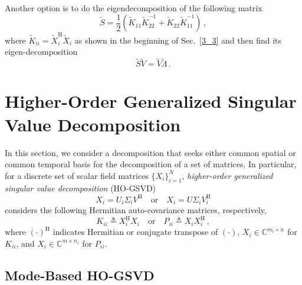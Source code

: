 \documentclass[10pt]{article}
\begin{document}
Another option is to do the eigendecomposition of the following matrix
\begin{equation}
    \tilde S = \frac{1}{2}\left(\tilde K_{11}\tilde K_{22}^{-1}+\tilde K_{22}\tilde K_{11}^{-1}\right)\,,
\end{equation}
where $\tilde K_{ii} = \tilde X_i^\mathrm{H} \tilde X_i$ as shown in the beginning of Sec.~\ref{3_3} and then find its eigen-decomposition 
\begin{equation}
    \tilde S \tilde V = \tilde  V \tilde \Lambda\,.
\end{equation}

\section{Higher-Order Generalized Singular Value Decomposition}

In this section, we consider a decomposition that seeks either common spatial or common temporal basis for the decomposition of a set of matrices.
In particular, for a discrete set of scalar field matrices $\{X_i\}_{i=1}^N$, {\em higher-order generalized singular value decomposition} (HO-GSVD)
\begin{equation}
    X_i = U_i \Sigma_i V^\mathrm{H} \quad \mathrm{or}\quad X_i = U \Sigma_i V_i^\mathrm{H}
\end{equation} 
considers the following Hermitian auto-covariance matrices, respectively,
\begin{equation}
    K_{ii} \triangleq X_i^\mathrm{H} X_i \quad \mathrm{or}\quad 
    P_{ii} \triangleq X_i X_i^\mathrm{H}\,,
\end{equation}
where $(\cdot)^\mathrm{H}$ indicates Hermitian or conjugate transpose of $(\cdot)$, $X_i\in\mathbb{C}^{m_i\times n}$ for $K_{ii}$, and $X_i\in \mathbb{C}^{m\times n_i}$ for $P_{ii}$.


\subsection{Mode-Based HO-GSVD}
\end{document}
